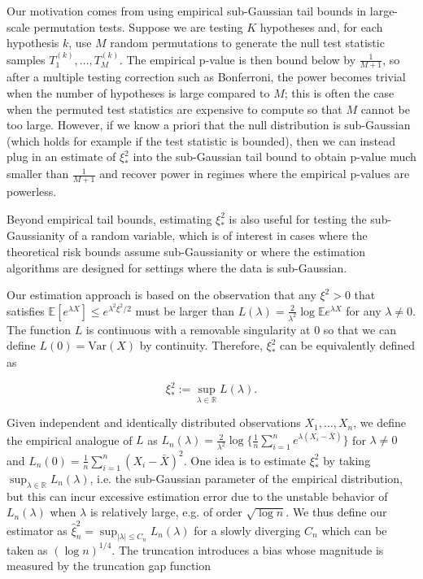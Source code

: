 \documentclass{article}
\theoremstyle{definition}
\newcommand{\1}{\mathbbm{1}}
\begin{document}
Our motivation comes from using empirical sub-Gaussian tail bounds in large-scale permutation tests. Suppose we are testing $K$ hypotheses and, for each hypothesis $k$, use $M$ random permutations to generate the null test statistic samples $T^{(k)}_1, \ldots, T^{(k)}_M$. The empirical p-value is then bound below by $\frac{1}{M+1}$, so after a multiple testing correction such as Bonferroni, the power becomes trivial when the number of hypotheses is large compared to $M$; this is often the case when the permuted test statistics are expensive to compute so that $M$ cannot be too large. However, if we know a priori that the null distribution is sub-Gaussian (which holds for example if the test statistic is bounded), then we can instead plug in an estimate of $\xi^2_*$ into the sub-Gaussian tail bound to obtain p-value much smaller than $\frac{1}{M+1}$ and recover power in regimes where the empirical p-values are powerless. 

Beyond empirical tail bounds, estimating $\xi^2_*$ is also useful for testing the sub-Gaussianity of a random variable, which is of interest in cases where the theoretical risk bounds assume sub-Gaussianity or where the estimation algorithms are designed for settings where the data is sub-Gaussian. 

Our estimation approach is based on the observation that any $\xi^2 > 0$ that satisfies $\mathbb{E}[e^{\lambda X}] \leq e^{\lambda^2 \xi^2 / 2}$ must be larger than $L(\lambda) = \frac{2}{\lambda^2} \log \mathbb{E} e^{\lambda X}$ for any $\lambda \ne 0$. The function $L$ is continuous with a removable singularity at 0 so that we can define $L(0) = \text{Var}(X)$ by continuity. Therefore, $\xi^2_*$ can be equivalently defined as 

\[
\xi_*^2 := \sup_{\lambda \in \mathbb{R}} L(\lambda). 
\]

Given independent and identically distributed observations $X_1, \ldots, X_n$, we define the empirical analogue of $L$ as $L_n(\lambda) = \frac{2}{\lambda^2} \log \bigl\{ \frac{1}{n} \sum_{i=1}^n e^{ \lambda (X_i - \bar{X})} \bigr\}$ for $\lambda \neq 0$ and $L_n(0) = \frac{1}{n}\sum_{i=1}^n (X_i - \bar{X})^2$. One idea is to estimate $\xi^2_*$ by taking $\sup_{\lambda \in \mathbb{R}} L_n(\lambda)$, i.e. the sub-Gaussian parameter of the empirical distribution, but this can incur excessive estimation error due to the unstable behavior of $L_n(\lambda)$ when $\lambda$ is relatively large, e.g. of order $\sqrt{\log n}$. We thus define our estimator as $\hat{\xi}^2_n = \sup_{|\lambda| \leq C_n} L_n(\lambda)$ for a slowly diverging $C_n$ which can be taken as $(\log n)^{1/4}$. The truncation introduces a bias whose magnitude is measured by the truncation gap function
\end{document}
